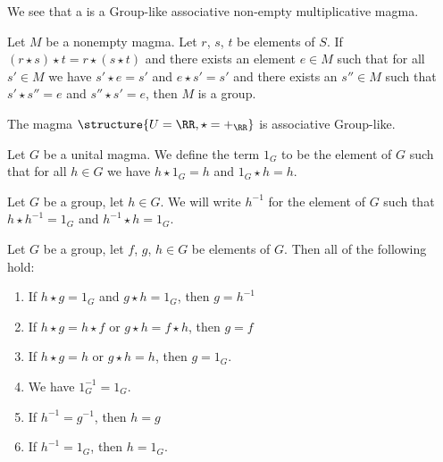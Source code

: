 \begin{definition}[Group]
We see that a  is a Group-like associative non-empty
multiplicative magma.
\end{definition}

\begin{theorem}
Let $M$ be a nonempty magma. Let $r$, $s$, $t$ be elements of $S$.
If $(r\star s)\star t=r\star(s\star t)$ and there exists an element
$e\in M$ such that for all $s'\in M$ we have $s'\star e=s'$ and
$e\star s'=s'$ and there exists an $s''\in M$ such that $s'\star s''=e$
and $s''\star s'=e$, then $M$ is a group.
\end{theorem}

\begin{theorem}
The magma $\structure{U=\RR,\star=+_{\RR}}$ is associative Group-like.
\end{theorem}

\begin{definition}
Let $G$ be a unital magma. We define the term $1_{G}$ to be the
element of $G$ such that for all $h\in G$ we have $h\star1_{G}=h$ and
$1_{G}\star h=h$.
\end{definition}

\begin{definition}
Let $G$ be a group, let $h\in G$. We will write $h^{-1}$ for the
element of $G$ such that $h\star h^{-1}=1_{G}$ and $h^{-1}\star h=1_{G}$.
\end{definition}

\begin{theorem}
Let $G$ be a group, let $f$, $g$, $h\in G$ be elements of $G$. Then
all of the following hold:
\begin{enumerate}
\item If $h\star g=1_{G}$ and $g\star h=1_{G}$, then $g=h^{-1}$
\item If $h\star g=h\star f$ or $g\star h=f\star h$, then $g=f$
\item If $h\star g=h$ or $g\star h=h$, then $g=1_{G}$.
\item We have $1_{G}^{-1}=1_{G}$.
\item If $h^{-1}=g^{-1}$, then $h = g$
\item If $h^{-1}=1_{G}$, then $h=1_{G}$.
\end{enumerate}
\end{theorem}

